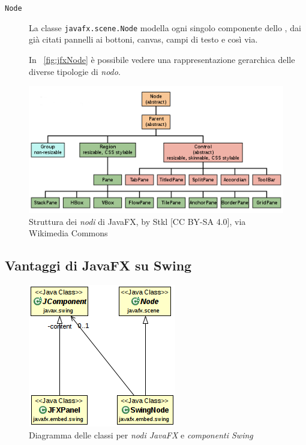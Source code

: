 \begin{description}
                \item[\texttt{Node}]\label{itm:nod} La classe \texttt{javafx\dothyp scene\dothyp Node} modella ogni singolo componente dello , dai già citati pannelli ai bottoni, canvas, campi di testo e così via.

                In \figurename~\vref{fig:jfxNode} è possibile vedere una rappresentazione gerarchica delle diverse tipologie di \emph{nodo}.
            \end{description}

            \begin{figure}[htbp]\label{fig:jfxNode}
                \centering
                \includegraphics[scale=0.8]{img/Javafx-layout-classes}
                \caption{Struttura dei \emph{nodi} di JavaFX, by Stkl [CC BY-SA 4.0], via Wikimedia Commons}
            \end{figure}

        \subsection{Vantaggi di JavaFX su Swing}\label{sub:jfxVantaggi}

            \begin{figure}[htbp]\label{fig:jfxSwingAdapt}
                \centering
                \includegraphics[scale=0.8]{img/jfxSwingAdapt}
                \caption{Diagramma delle classi  per \emph{nodi JavaFX} e \emph{componenti Swing}}
            \end{figure}

